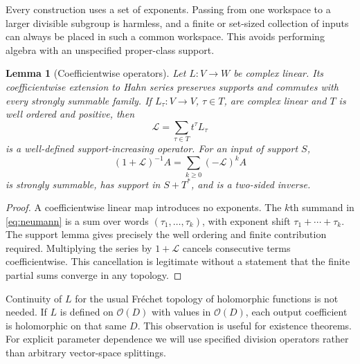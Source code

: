 \documentclass[11pt,letterpaper]{article}
\newtheorem{lemma}[theorem]{Lemma}
\theoremstyle{definition}
\theoremstyle{remark}
\newcommand{\OO}{\mathcal O}
\begin{document}
Every construction uses a set of exponents. Passing from one workspace to a larger divisible subgroup is harmless, and a finite or set-sized collection of inputs can always be placed in such a common workspace. This avoids performing algebra with an unspecified proper-class support.

\begin{lemma}[Coefficientwise operators]\label{lem:operators}
Let $L:V\to W$ be complex linear. Its coefficientwise extension to Hahn series preserves supports and commutes with every strongly summable family. If $L_\tau:V\to V$, $\tau\in T$, are complex linear and $T$ is well ordered and positive, then
\[
 \mathcal L=\sum_{\tau\in T}t^\tau L_\tau
\]
is a well-defined support-increasing operator. For an input of support $S$,
\begin{equation}\label{eq:neumann}
 (1+\mathcal L)^{-1}A=\sum_{k\geq0}(-\mathcal L)^k A
\end{equation}
is strongly summable, has support in $S+T^*$, and is a two-sided inverse.
\end{lemma}
\begin{proof}
A coefficientwise linear map introduces no exponents. The $k$th summand in \eqref{eq:neumann} is a sum over words $(\tau_1,\ldots,\tau_k)$, with exponent shift $\tau_1+\cdots+\tau_k$. The support lemma gives precisely the well ordering and finite contribution required. Multiplying the series by $1+\mathcal L$ cancels consecutive terms coefficientwise. This cancellation is legitimate without a statement that the finite partial sums converge in any topology.
\end{proof}

Continuity of $L$ for the usual Fr\'echet topology of holomorphic functions is not needed. If $L$ is defined on $\OO(D)$ with values in $\OO(D)$, each output coefficient is holomorphic on that same $D$. This observation is useful for existence theorems. For explicit parameter dependence we will use specified division operators rather than arbitrary vector-space splittings.
\end{document}
